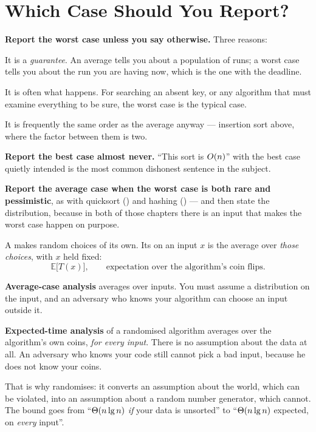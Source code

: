 \section{Which Case Should You Report?}

\begin{conceptbox}
\textbf{Report the worst case unless you say otherwise.} Three reasons:

\begin{tightnum}
  \item It is a \emph{guarantee}. An average tells you about a population of
        runs; a worst case tells you about the run you are having now, which is
        the one with the deadline.
  \item It is often what happens. For searching an absent key, or any
        algorithm that must examine everything to be sure, the worst case is
        the typical case.
  \item It is frequently the same order as the average anyway --- insertion
        sort above, where the factor between them is two.
\end{tightnum}

\smallskip
\textbf{Report the best case almost never.} ``This sort is $O(n)$'' with the
best case quietly intended is the most common dishonest sentence in the
subject.

\smallskip
\textbf{Report the average case when the worst case is both rare and
pessimistic}, as with quicksort () and hashing
() --- and then state the distribution, because in both of those
chapters there is an input that makes the worst case happen on purpose.
\end{conceptbox}

\begin{definitionbox}
A  makes random choices of its own. Its
 on an input $x$ is the average over
\emph{those choices}, with $x$ held fixed:
\[ \mathbb{E}\bigl[T(x)\bigr], \qquad
   \text{expectation over the algorithm's coin flips.} \]
\end{definitionbox}

\begin{alertbox}
\textbf{Average-case analysis} averages over inputs. You must assume a
distribution on the input, and an adversary who knows your algorithm can choose
an input outside it.

\smallskip
\textbf{Expected-time analysis} of a randomised algorithm averages over the
algorithm's own coins, \emph{for every input}. There is no assumption about the
data at all. An adversary who knows your code still cannot pick a bad input,
because he does not know your coins.

\smallskip
That is why  randomises: it converts an assumption about the
world, which can be violated, into an assumption about a random number
generator, which cannot. The bound goes from ``$\Theta(n \operatorname{lg} n)$ \emph{if} your
data is unsorted'' to ``$\Theta(n \operatorname{lg} n)$ expected, on \emph{every} input''.
\end{alertbox}


